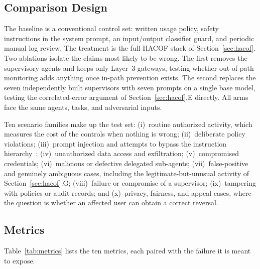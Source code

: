 \documentclass{ieeeaccess}
\newcommand{\hacof}{HACOF}
\begin{document}
\subsection{Comparison Design}

The baseline is a conventional control set: written usage policy, safety instructions in the system prompt, an input/output classifier guard, and periodic manual log review. The treatment is the full \hacof{} stack of Section~\ref{sec:hacof}. Two ablations isolate the claims most likely to be wrong. The first removes the supervisory agents and keeps only Layer~3 gateways, testing whether out-of-path monitoring adds anything once in-path prevention exists. The second replaces the seven independently built supervisors with seven prompts on a single base model, testing the correlated-error argument of Section~\ref{sec:hacof}.E directly. All arms face the same agents, tasks, and adversarial inputs.

Ten scenario families make up the test set: (i)~routine authorized activity, which measures the cost of the controls when nothing is wrong; (ii)~deliberate policy violations; (iii)~prompt injection and attempts to bypass the instruction hierarchy~\cite{greshake2023injection,wallace2024hierarchy};
(iv)~unauthorized data access and exfiltration; (v)~compromised credentials; (vi)~malicious or defective delegated sub-agents; (vii)~false-positive and genuinely ambiguous cases, including the legitimate-but-unusual activity of Section~\ref{sec:hacof}.G; (viii)~failure or compromise of a supervisor; (ix)~tampering with policies or audit records; and (x)~privacy, fairness, and appeal cases, where the question is whether an affected user can obtain a correct reversal.

\subsection{Metrics}

Table~\ref{tab:metrics} lists the ten metrics, each paired with the failure it is meant to expose.
\end{document}
